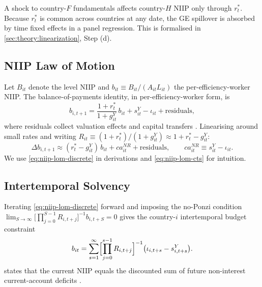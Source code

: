 \begin{corollary}[GE Spillover]\label{cor:ge-spillover}
A shock to country-$F$ fundamentals affects country-$H$ NIIP only through
$r_t^*$. Because $r_t^*$ is common across countries at any date, the GE
spillover is absorbed by time fixed effects in a panel regression. This is
formalised in \cref{sec:theory:linearization}, Step (d).
\end{corollary}

\subsection{NIIP Law of Motion}\label{sec:theory:niip-lom}

Let $B_{it}$ denote the level NIIP and $b_{it}\equiv B_{it}/(A_{it}L_{it})$
the per-efficiency-worker NIIP. The balance-of-payments identity, in
per-efficiency-worker form, is
\begin{equation}
b_{i,t+1}=\frac{1+r_t^*}{1+g_{it}^Y}\,b_{it}+s_{it}^Y-\iota_{it}+\text{residuals},
\label{eq:niip-lom-discrete}
\end{equation}
where residuals collect valuation effects and capital transfers
\citep{ObstfeldRogoff1995}. Linearising around small rates and writing
$R_{it}\equiv (1+r_t^*)/(1+g_{it}^Y)\approx 1+r_t^*-g_{it}^Y$:
\begin{equation}
\Delta b_{i,t+1}\approx (r_t^*-g_{it}^Y)\,b_{it}+ca_{it}^{NR}+\text{residuals},
\qquad ca_{it}^{NR}\equiv s_{it}^Y-\iota_{it}.
\label{eq:niip-lom-cts}
\end{equation}
We use \eqref{eq:niip-lom-discrete} in derivations and \eqref{eq:niip-lom-cts}
for intuition.

\subsection{Intertemporal Solvency}\label{sec:theory:solvency}

Iterating \eqref{eq:niip-lom-discrete} forward and imposing the no-Ponzi
condition $\lim_{S\to\infty}\bigl[\prod_{j=0}^{S-1}R_{i,t+j}\bigr]^{-1}b_{i,t+S}=0$
gives the country-$i$ intertemporal budget constraint
\begin{equation}
b_{it}=\sum_{s=1}^{\infty}\Bigl[\prod_{j=0}^{s-1}R_{i,t+j}\Bigr]^{-1}\bigl(\iota_{i,t+s}-s_{i,t+s}^Y\bigr).
\label{eq:ibc}
\end{equation}
 states that the current NIIP equals the discounted sum of future
non-interest current-account deficits \citep{Sachs1981,ObstfeldRogoff1995}.

